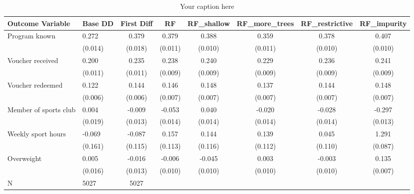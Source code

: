 \begin{sidewaystable*}
\centering
\begin{tabular}{llcccccc}
\hline
Outcome Variable & Base DD & First Diff & RF & RF_shallow & RF_more_trees & RF_restrictive & RF_impurity \\
\hline
Program known & 0.272 & 0.379 & 0.379 & 0.388 & 0.359 & 0.378 & 0.407 \\
  & (0.014) & (0.018) & (0.011) & (0.010) & (0.011) & (0.010) & (0.010) \\
Voucher received & 0.200 & 0.235 & 0.238 & 0.240 & 0.229 & 0.236 & 0.241 \\
  & (0.011) & (0.011) & (0.009) & (0.009) & (0.009) & (0.009) & (0.009) \\
Voucher redeemed & 0.122 & 0.144 & 0.146 & 0.148 & 0.137 & 0.144 & 0.148 \\
  & (0.006) & (0.006) & (0.007) & (0.007) & (0.007) & (0.007) & (0.007) \\
Member of sports club & 0.004 & -0.009 & -0.053 & 0.040 & -0.020 & -0.028 & -0.297 \\
  & (0.019) & (0.013) & (0.014) & (0.014) & (0.014) & (0.014) & (0.013) \\
Weekly sport hours & -0.069 & -0.087 & 0.157 & 0.144 & 0.139 & 0.045 & 1.291 \\
  & (0.161) & (0.115) & (0.113) & (0.116) & (0.112) & (0.110) & (0.087) \\
Overweight & 0.005 & -0.016 & -0.006 & -0.045 & 0.003 & -0.003 & 0.135 \\
  & (0.016) & (0.013) & (0.010) & (0.010) & (0.010) & (0.010) & (0.007) \\
\hline
N & 5027 & 5027  &  &  &  &  \\
\hline
\end{tabular}
\caption{Your caption here}
\label{tab:your_label}
\end{sidewaystable*}